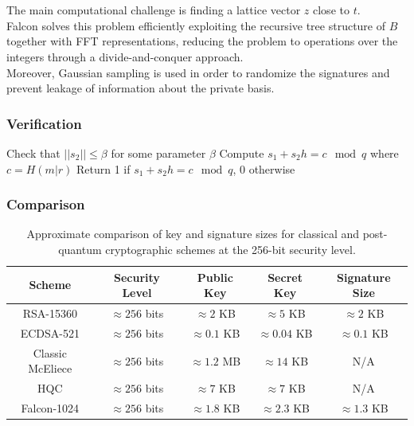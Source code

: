 \noindent
The main computational challenge is finding a lattice vector $z$ close to $t$.\\
Falcon solves this problem efficiently exploiting the recursive tree structure of $\hat{B}$ together with FFT representations, reducing the problem to operations over the integers through a divide-and-conquer approach.\\
Moreover, Gaussian sampling is used in order to randomize the signatures and prevent leakage of information about the private basis.
\newpage

\subsubsection*{Verification}
\begin{algorithm}
\begin{algorithmic}[1]
    \State Check that $||s_2|| \leq \beta$ for some parameter $\beta$
    \State Compute $s_1 + s_2 h = c \mod q$ where $c = H(m|r)$
    \State Return 1 if $s_1 + s_2 h = c \mod q$, 0 otherwise
\end{algorithmic}
\end{algorithm}

\subsubsection{Comparison}
\begin{table}[H]
\centering
\small
\renewcommand{\arraystretch}{1.35}
\begin{tabular}{|c|c|c|c|c|}
\hline
\rowcolor{gray!20}
\textbf{Scheme} & \textbf{Security Level} & \textbf{Public Key} & \textbf{Secret Key} & \textbf{Signature Size} \\
\hline

RSA-15360 & $\approx 256$ bits & $\approx 2$ KB & $\approx 5$ KB & $\approx 2$ KB \\
\hline

ECDSA-521 & $\approx 256$ bits & $\approx 0.1$ KB & $\approx 0.04$ KB & $\approx 0.1$ KB \\
\hline

Classic McEliece & $\approx 256$ bits & $\approx 1.2$ MB & $\approx 14$ KB & N/A \\
\hline

HQC & $\approx 256$ bits & $\approx 7$ KB & $\approx 7$ KB & N/A \\
\hline

Falcon-1024 & $\approx 256$ bits & $\approx 1.8$ KB & $\approx 2.3$ KB & $\approx 1.3$ KB \\
\hline

\end{tabular}
\caption{Approximate comparison of key and signature sizes for classical and post-quantum cryptographic schemes at the 256-bit security level.}
\label{tab:pqc_comparison}
\end{table}

